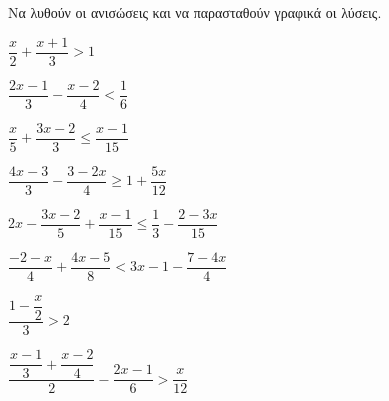 Να λυθούν οι ανισώσεις και να παρασταθούν γραφικά οι λύσεις.
\begin{multicols}{2}
\begin{alist}
\item $ \dfrac{x}{2}+\dfrac{x+1}{3}>1 $
\item $ \dfrac{2x-1}{3}-\dfrac{x-2}{4}<\dfrac{1}{6} $
\item $ \dfrac{x}{5}+\dfrac{3x-2}{3}\leq\dfrac{x-1}{15} $
\item $ \dfrac{4x-3}{3}-\dfrac{3-2x}{4}\geq1+\dfrac{5x}{12} $
\vfill
\columnbreak
\vfill
\item $ 2x-\dfrac{3x-2}{5}+\dfrac{x-1}{15}\leq\dfrac{1}{3}-\dfrac{2-3x}{15} $
\item $ \dfrac{-2-x}{4}+\dfrac{4x-5}{8}<3x-1-\dfrac{7-4x}{4} $
\item $ \dfrac{1-\dfrac{x}{2}}{3}>2 $
\item $ \dfrac{\dfrac{x-1}{3}+\dfrac{x-2}{4}}{2}-\dfrac{2x-1}{6}>\dfrac{x}{12} $
\end{alist}
\end{multicols}
